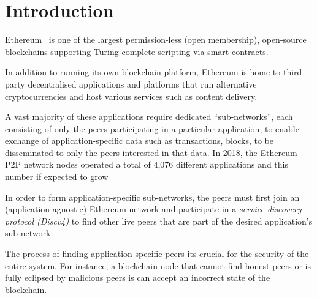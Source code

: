
\section{Introduction}
Ethereum~\cite{buterin2013ethereum}  is one of the largest permission-less (\ie open membership),  open-source  blockchains supporting Turing-complete scripting via smart contracts. 

In addition to running its own blockchain platform, Ethereum is home to third-party decentralised applications and platforms that run alternative cryptocurrencies and host various services such as content delivery. 

A vast majority of these applications require dedicated ``sub-networks'', each consisting of only the peers participating in a particular application, to enable exchange of application-specific data such as transactions, blocks, \etc to be disseminated to only the peers interested in that data. In 2018, the Ethereum P2P network nodes operated a total of 4,076 different applications and this number if expected to grow~\cite{kim2018measuring}

In order to form application-specific sub-networks, the peers must first join an (application-agnostic) Ethereum network and participate in a \textit{service discovery protocol (Discv4)} to find other live peers that are part of the desired application's sub-network. 

The process of finding application-specific peers its crucial for the security of the entire system. For instance, a blockchain node that cannot find honest peers or is fully eclipsed by malicious peers is can accept an incorrect state of the blockchain. 


